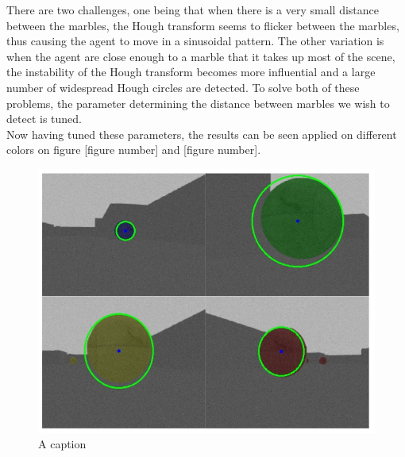 \documentclass[../../../../main.tex]{subfile}
\begin{document}
There are two challenges, one being that when there is a very small distance between the marbles, the Hough transform seems to flicker between the marbles, thus causing the agent to move in a sinusoidal pattern. The other variation is when the agent are close enough to a marble that it takes up most of the scene, the instability of the Hough transform becomes more influential and a large number of widespread Hough circles are detected. To solve both of these problems, the parameter determining the distance between marbles we wish to detect is tuned.\\
Now having tuned these parameters, the results can be seen applied on different colors on figure [figure number] and [figure number].



\begin{figure}
\centering
\includegraphics[width=.98\linewidth]{hough_detect_colors.png}
\caption{A caption}
\end{figure}
\blindtext
\end{document}
